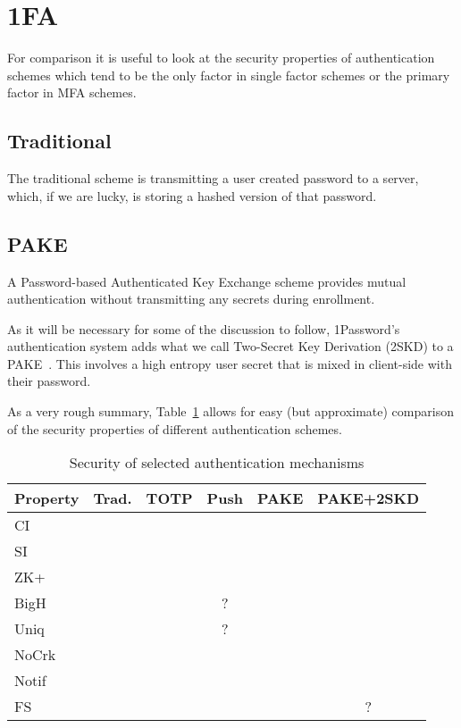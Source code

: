 \documentclass{soups}
\newcommand{\cmark}{\ding{51}}%
\newcommand{\xmark}{\ding{53}}%
\newcommand{\prop}[1]{\textsf{#1}}
\begin{document}
\section{1FA}

For comparison it is useful to look at the security properties
of authentication schemes which tend to be the only factor in single
factor schemes or the primary factor in MFA schemes.

\subsection{Traditional}
The traditional scheme is transmitting a user created password to a server,
which, if we are lucky, is storing a hashed version of that password.

\subsection{PAKE}
A Password-based Authenticated Key Exchange scheme provides mutual authentication
without transmitting any secrets during enrollment.

As it will be necessary for some of the discussion to follow,
1Password's authentication system adds what we call
Two-Secret Key Derivation (2SKD) to a PAKE~\autocite{1Password:whitepaper}.
This involves a
high entropy user secret that is mixed in client-side with their password.

As a very rough summary, Table~\ref{tab:props} allows for easy
(but approximate) comparison of the security properties of different
authentication schemes.

\begin{table}
  \caption{Security of selected authentication mechanisms}\label{tab:props}
  \begin{tabular}{lccccc}
    \textbf{Property} & \textbf{Trad.}   & \textbf{TOTP}    & \textbf{Push}    & \textbf{PAKE}   & \textbf{PAKE+2SKD} \\
    \hline
    \prop{CI}       & \cmark  & \cmark  & \cmark  & \cmark  & \cmark \\
    \prop{SI}       & \xmark  & \xmark  & \xmark  & \cmark  & \cmark \\
    \prop{ZK+}      & \xmark  & \cmark  & \cmark  & \cmark  & \cmark \\
    \prop{BigH}     & \xmark  & \cmark  & ?       & \xmark  & \cmark \\
    \prop{Uniq}     & \xmark  & \cmark  & ?       & \xmark  & \cmark \\
    \prop{NoCrk}    & \xmark  & \xmark  & \xmark  & \xmark  & \cmark \\
    \prop{Notif}    & \xmark  & \xmark  & \cmark  & \xmark  & \xmark \\
    \prop{FS}       & \xmark  & \cmark  & \cmark  & \xmark  & ?
  \end{tabular}
\end{table}
\end{document}
